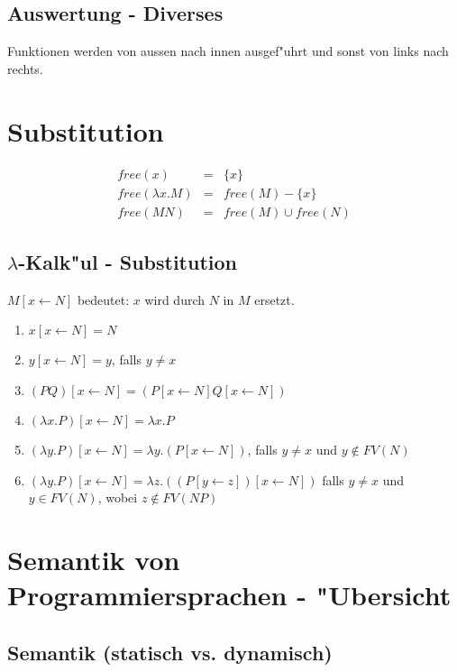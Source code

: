 \documentclass[german,10pt, a4paper, twocolumn]{scrartcl}
\theoremstyle{definition}
\theoremstyle{remark}
\begin{document}
\subsection{Auswertung - Diverses}

Funktionen werden von aussen nach innen ausgef"uhrt und sonst von links nach rechts.

\section{Substitution}

\begin{eqnarray}
	free(x) &		= &	\{ x \} \nonumber\\
	free(\lambda x. M) &	= &	free(M) - \{ x \} \nonumber\\
	free(M N) &		= &	free(M) \cup free(N) \nonumber
\end{eqnarray}

\subsection{$\lambda$-Kalk"ul - Substitution}

$M[x \leftarrow N]$ bedeutet: $x$ wird durch $N$ in $M$ ersetzt.

\begin{enumerate}
	\item $x[x \leftarrow N] = N$
	\item $y[x \leftarrow N] = y$, falls $y \neq x$
	\item $(PQ)[x \leftarrow N] = (P[x \leftarrow N]Q[x \leftarrow N])$
	\item $(\lambda x.P)[x \leftarrow N]=\lambda x.P$
	\item $(\lambda y.P)[x \leftarrow N]=\lambda y. (P[x \leftarrow N])$, falls $y\neq x$ und $y \not \in FV(N)$
	\item $(\lambda y.P)[x \leftarrow N]=\lambda z. ((P[y\leftarrow z])[x\leftarrow N])$ falls $y\neq x$ und $y \in FV(N)$, wobei $z\not\in FV(NP)$
\end{enumerate}

\section{Semantik von Programmiersprachen - "Ubersicht}

\subsection{Semantik (statisch vs. dynamisch)}
\end{document}
